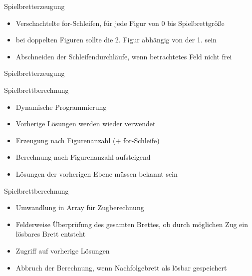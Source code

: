 \documentclass{beamer}
\begin{document}
\begin{frame}{Spielbretterzeugung}
\begin{itemize}
	\item Verschachtelte for-Schleifen, für jede Figur von 0 bis Spielbrettgröße
	\item bei doppelten Figuren sollte die 2. Figur abhängig von der 1. sein
	\item Abschneiden der Schleifendurchläufe, wenn betrachtetes Feld nicht frei
\end{itemize}
\end{frame}



\begin{frame}[allowframebreaks]{Spielbretterzeugung}
\Lst
\end{frame}


\begin{frame}{Spielbrettberechnung}
\begin{itemize}
	\item Dynamische Programmierung
	\item Vorherige Lösungen werden wieder verwendet
	\item Erzeugung nach Figurenanzahl (+ for-Schleife)
	\item Berechnung nach Figurenanzahl aufsteigend
	\item Lösungen der vorherigen Ebene müssen bekannt sein
\end{itemize}
\end{frame}


\begin{frame}{Spielbrettberechnung}
\begin{itemize}

	\item Umwandlung in Array für Zugberechnung
	\item Felderweise Überprüfung des gesamten Brettes, ob durch möglichen Zug ein lösbares Brett entsteht
	\item Zugriff auf vorherige Lösungen
	\item Abbruch der Berechnung, wenn Nachfolgebrett als lösbar gespeichert 
\end{itemize}
\end{frame}
\end{document}
